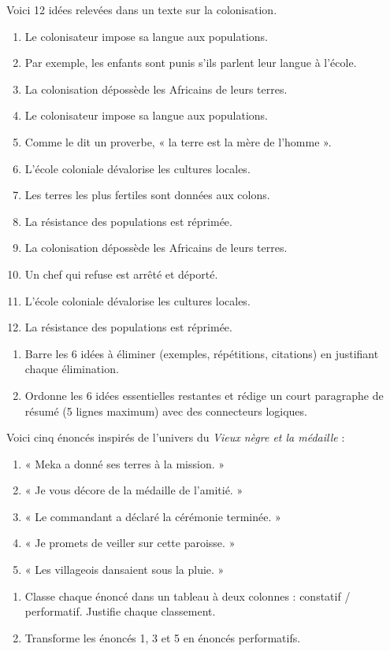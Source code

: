 \documentclass[11pt]{article}
\begin{document}
\begin{exercice}
Voici 12 idées relevées dans un texte sur la colonisation.
\begin{enumerate}
\item Le colonisateur impose sa langue aux populations.
\item Par exemple, les enfants sont punis s'ils parlent leur langue à l'école.
\item La colonisation dépossède les Africains de leurs terres.
\item Le colonisateur impose sa langue aux populations.
\item Comme le dit un proverbe, « la terre est la mère de l'homme ».
\item L'école coloniale dévalorise les cultures locales.
\item Les terres les plus fertiles sont données aux colons.
\item La résistance des populations est réprimée.
\item La colonisation dépossède les Africains de leurs terres.
\item Un chef qui refuse est arrêté et déporté.
\item L'école coloniale dévalorise les cultures locales.
\item La résistance des populations est réprimée.
\end{enumerate}
\begin{enumerate}
\item Barre les 6 idées à éliminer (exemples, répétitions, citations) en justifiant chaque élimination.
\item Ordonne les 6 idées essentielles restantes et rédige un court paragraphe de résumé (5 lignes maximum) avec des connecteurs logiques.
\end{enumerate}
\end{exercice}

\begin{exercice}
Voici cinq énoncés inspirés de l'univers du \emph{Vieux nègre et la médaille} :
\begin{enumerate}
\item « Meka a donné ses terres à la mission. »
\item « Je vous décore de la médaille de l'amitié. »
\item « Le commandant a déclaré la cérémonie terminée. »
\item « Je promets de veiller sur cette paroisse. »
\item « Les villageois dansaient sous la pluie. »
\end{enumerate}
\begin{enumerate}
\item Classe chaque énoncé dans un tableau à deux colonnes : constatif / performatif. Justifie chaque classement.
\item Transforme les énoncés 1, 3 et 5 en énoncés performatifs.
\end{enumerate}
\end{exercice}
\end{document}
